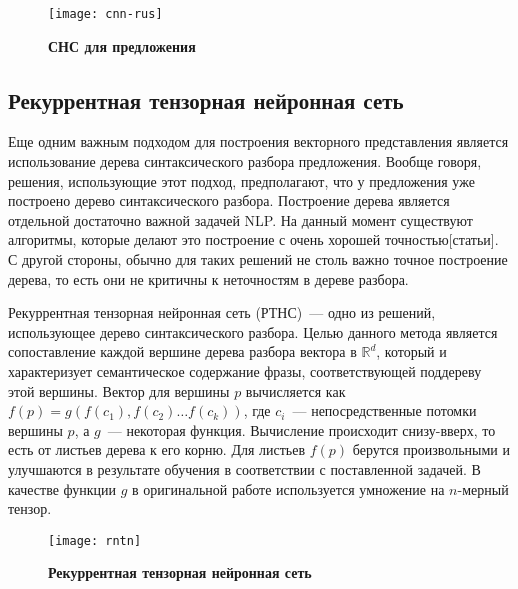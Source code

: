 \begin{figure}[h]
\texttt{[image: cnn-rus]}
\caption{\textbf{СНС для предложения}}
\label{fig:cnn}
\end{figure}

\subsection{Рекуррентная тензорная нейронная сеть}
Еще одним важным подходом для построения векторного представления является использование 
дерева синтаксического разбора предложения. Вообще говоря, решения, использующие этот подход, предполагают, что у предложения уже построено дерево синтаксического разбора. Построение дерева является отдельной достаточно важной задачей NLP. На данный момент существуют алгоритмы, которые делают это построение с очень хорошей точностью[статьи]. 
С другой стороны, обычно для таких решений не столь важно точное построение дерева, то есть они не критичны к неточностям в дереве разбора.

Рекуррентная тензорная нейронная сеть (РТНС)~--- одно из решений, использующее дерево синтаксического разбора. Целью данного метода является сопоставление каждой вершине дерева разбора вектора в $\mathbb{R}^d$, 
который и характеризует семантическое содержание фразы, соответствующей поддереву этой вершины.
Вектор для вершины $p$ вычисляется как $f(p)=g(f(c_1), f(c_2) \dots{} f(c_k))$, где $c_i$~--- непосредственные потомки вершины $p$, а $g$~--- некоторая функция. Вычисление происходит снизу-вверх, то
есть от листьев дерева к его корню. Для листьев $f(p)$ берутся произвольными и улучшаются в результате обучения в соответствии с поставленной задачей.
В качестве функции $g$ в оригинальной работе\cite{socher-EtAl:2013:EMNLP} используется умножение на $n$-мерный тензор.

\begin{figure}[h]
\texttt{[image: rntn]}
\caption{\textbf{Рекуррентная тензорная нейронная сеть}}
\label{fig:rntn}
\end{figure}